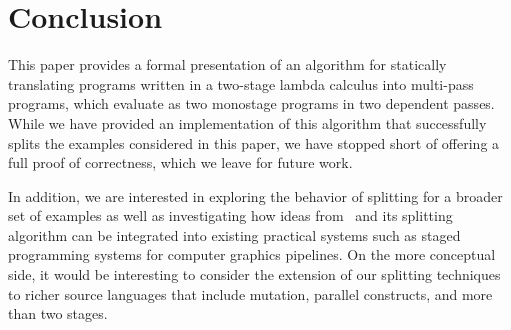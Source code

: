 \section{Conclusion}

This paper provides a formal presentation of an algorithm for
statically translating programs written in a two-stage lambda calculus
into multi-pass programs, which evaluate as two monostage programs in
two dependent passes.  While we have provided an implementation of
this algorithm that successfully splits the examples considered in
this paper, we have stopped short of offering a full proof of
correctness, which we leave for future work.

In addition, we are interested in exploring the behavior of splitting
for a broader set of examples as well as investigating how ideas from
\lang\ and its splitting algorithm can be integrated into existing
practical systems such as staged programming systems for computer
graphics pipelines.  On the more conceptual side, it would be
interesting to consider the extension of our splitting techniques to
richer source languages that include mutation, parallel constructs,
and more than two stages.

